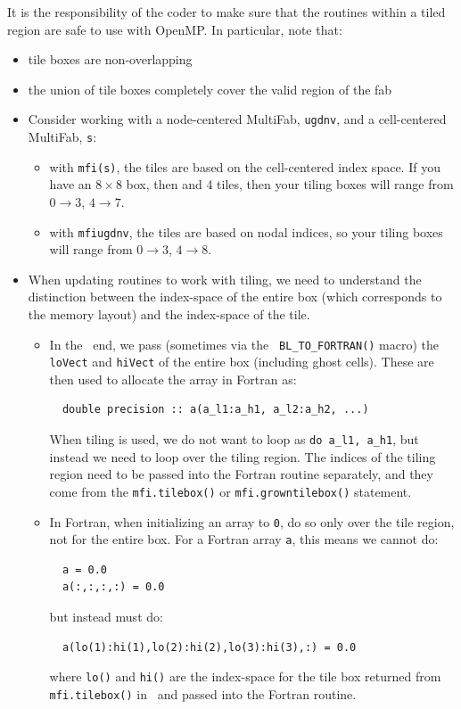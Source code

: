 It is the responsibility of the coder to make sure that the routines
within a tiled region are safe to use with OpenMP.  In particular,
note that:
\begin{itemize}
\item tile boxes are non-overlapping
\item the union of tile boxes completely cover the valid region of the
  fab
\item Consider working with a node-centered MultiFab, {\tt ugdnv}, and
  a cell-centered MultiFab, {\tt s}:
  \begin{itemize}

  \item with {\tt mfi(s)}, the tiles are based on the cell-centered
    index space.  If you have an $8\times 8$ box, then and 4 tiles,
    then your tiling boxes will range from $0\rightarrow 3$,
    $4\rightarrow 7$.

  \item with {\tt mfi{ugdnv}}, the tiles are based on nodal indices,
    so your tiling boxes will range from $0\rightarrow 3$,
    $4\rightarrow 8$.

  \end{itemize}

\item When updating routines to work with tiling, we need to
  understand the distinction between the index-space of the entire box
  (which corresponds to the memory layout) and the index-space of the
  tile.

  \begin{itemize}

  \item In the \cpp\ end, we pass (sometimes via the {\tt
    BL\_TO\_FORTRAN()} macro) the {\tt loVect} and {\tt hiVect} of the
    entire box (including ghost cells).  These are then used to
    allocate the array in Fortran as:
\begin{lstlisting}
  double precision :: a(a_l1:a_h1, a_l2:a_h2, ...)
\end{lstlisting}
    When tiling is used, we do not want to loop as {\tt do a\_l1,
      a\_h1}, but instead we need to loop over the tiling region.  The
    indices of the tiling region need to be passed into the Fortran
    routine separately, and they come from the {\tt mfi.tilebox()}
    or {\tt mfi.growntilebox()} statement.

  \item In Fortran, when initializing an array to {\tt 0}, do so only
    over the tile region, not for the entire box.  For a Fortran array
    {\tt a}, this means we cannot do:
\begin{lstlisting}
  a = 0.0
  a(:,:,:,:) = 0.0
\end{lstlisting}
    but instead must do:
\begin{lstlisting}
  a(lo(1):hi(1),lo(2):hi(2),lo(3):hi(3),:) = 0.0
\end{lstlisting}
    where {\tt lo()} and {\tt hi()} are the index-space for the tile box
    returned from {\tt mfi.tilebox()} in \cpp\ and passed into the Fortran
    routine.


\end{itemize}
\end{itemize}
